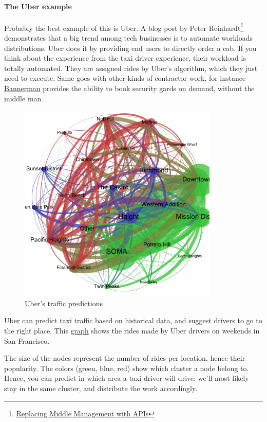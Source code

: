 \documentclass[12pt]{article}
\begin{document}
\paragraph{The Uber example}

Probably the best example of this is Uber. A blog post by Peter
Reinhardt\footnote{\href{http://rein.pk/replacing-middle-management-with-apis/}
{Replacing Middle Management with APIs}} demonstrates that a big trend among
tech businesses is to automate workloads distributions. Uber does it by
providing end users to directly order a cab. If you think about the experience
from the taxi driver experience, their workload is totally automated. They are
assigned rides by Uber's algorithm, which they just need to execute. Same goes
with other kinds of contractor work, for instance
\href{https://www.getbannerman.com/} {Bannerman} provides the ability to book
security gards on demand, without the middle man.


\begin{figure}[h]
    \centering
    \includegraphics[scale=0.8]{uber-graph}
    \caption{Uber's traffic predictions}
    \label{fig:uber-graph}
\end{figure}

\smallskip

Uber can predict taxi traffic based on historical data, and suggest drivers to
go to the right place. This
\href{http://blogs.mathworks.com/loren/2014/09/06/analyzing-uber-ride-sharing-gps-data/}
{graph} shows the rides made by Uber drivers on weekends in San Francisco.

The size of the nodes represent the number of rides per location, hence their
popularity. The colors (green, blue, red) show which cluster a node belong to.
Hence, you can predict in which area a taxi driver will drive: we'll most likely
stay in the same cluster, and distribute the work accordingly.
\end{document}
